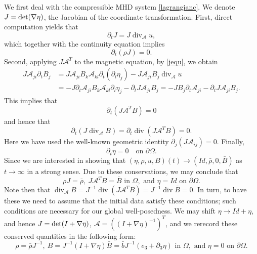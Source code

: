 \documentclass[a4paper,reqno,11pt]{amsart}
\numberwithin{equation}{section}
\begin{document}
We first deal with the compressible MHD system \eqref{lagrangianc}. We denote $J={\rm det} (\nabla\eta)$, the Jacobian of the coordinate transformation. First, direct computation yields that
\begin{equation}\label{jequ}
\partial_t J =J\operatorname{div}_{\mathcal{A}}    u ,
\end{equation}
which together with the continuity equation implies
\begin{equation}
{\partial_t}(\rho J)=0.
 \end{equation}
Second, applying $J{\mathcal{A}}^T $ to the magnetic equation, by \eqref{jequ}, we obtain
\begin{equation}
\begin{split}
J{\mathcal{A}}_{ji}\partial_tB_j&=J{\mathcal{A}}_{ji}B_k{\mathcal{A}}_{kl}\partial_t(\partial_l\eta_j)-J{\mathcal{A}}_{ji}B_j \operatorname{div}_{\mathcal{A}} u
\\&=-J \partial_t{\mathcal{A}}_{ji}B_k{\mathcal{A}}_{kl}\partial_l\eta_j-{\partial_t} J{\mathcal{A}}_{ji}B_j=-JB_j\partial_t{\mathcal{A}}_{ji}-{\partial_t} J{\mathcal{A}}_{ji}B_j.
\end{split}
\end{equation}
This implies that
\begin{equation}
\partial_t (J{\mathcal{A}}^T B)=0
\end{equation}
 and hence that
\begin{equation}
\partial_t (J{\operatorname{div}_{\mathcal{A}}} B)= \partial_t \operatorname{div}(J{\mathcal{A}}^T B)=0.
\end{equation}
Here we have used the well-known geometric identity $\partial_j(J{\mathcal{A}}_{ij})=0$.
Finally,
\begin{equation}
{\partial_t} \eta =0\quad\text{on } {\partial}\Omega.
\end{equation}
Since we are interested in showing that $(\eta,\rho,u,B)(t)\rightarrow (Id, \bar \rho,0,\bar B)$ as $t\rightarrow\infty$ in a strong sense. Due to these conservations, we may conclude that
\begin{equation}
\rho J =\bar\rho,\ J{\mathcal{A}}^T B= \bar B \text{ in }\Omega, \text{ and }\eta=Id \text{ on }{\partial}\Omega.
\end{equation}
Note then that ${\operatorname{div}_{\mathcal{A}}} B =J^{-1}\operatorname{div}(J{\mathcal{A}}^T B)=J^{-1}\operatorname{div}\bar B=0$. In turn, to have these we need to assume that the initial data satisfy these conditions; such conditions are necessary for our global well-posedness. We may shift $\eta\rightarrow Id+\eta$, and hence $J={\rm det} (I+\nabla\eta)$, ${\mathcal{A}}=((I+\nabla\eta)^{-1})^T$, and we rerecord these conserved quantities in the following form:
\begin{equation}\label{imp1}
\rho = \bar\rho J^{-1},\ B = J^{-1}(I+\nabla \eta)\bar B=\bar b J^{-1}(e_3+{\partial}_3 \eta) \text{ in }\Omega, \text{ and }\eta=0 \text{ on }{\partial}\Omega.
\end{equation}
\end{document}
